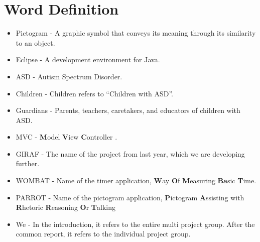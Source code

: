 
\chapter*{Word Definition}

\begin{itemize}

	\item Pictogram - A graphic symbol that conveys its meaning through its similarity to an object.
	\item Eclipse - A development environment for Java.
	\item ASD - Autism Spectrum Disorder.
	\item Children - Children refers to ``Children with ASD''.
	\item Guardians - Parents, teachers, caretakers, and educators of children with ASD.
	\item MVC - \textbf{M}odel \textbf{V}iew \textbf{C}ontroller \cite{MVC}.
	\item GIRAF - The name of the project from last year, which we are developing further.
	\item WOMBAT - Name of the timer application, \textbf{W}ay \textbf{O}f \textbf{M}easuring \textbf{Ba}sic \textbf{T}ime.
	\item PARROT - Name of the pictogram application, \textbf{P}ictogram \textbf{A}ssisting with \textbf{R}hetoric \textbf{R}easoning \textbf{O}r \textbf{T}alking
	\item We - In the introduction, it refers to the entire multi project group. After the common report, it refers to the individual project group.

\end{itemize}